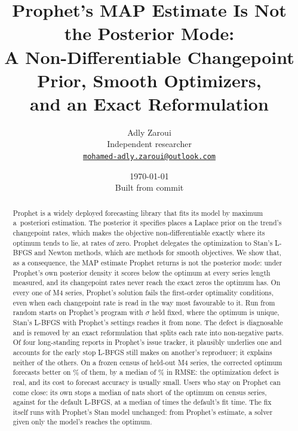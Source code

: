 \documentclass[11pt]{article}
\title{Prophet's MAP Estimate Is Not the Posterior Mode:\\
       A Non-Differentiable Changepoint Prior, Smooth Optimizers,\\
       and an Exact Reformulation}
\author{Adly Zaroui\\[2pt]
  {\small Independent researcher}\\[1pt]
  {\small\href{mailto:mohamed-adly.zaroui@outlook.com}%
                {\texttt{mohamed-adly.zaroui@outlook.com}}}}
\date{\today\\[2pt]{\small Built from commit \texttt{\BuildCommit}}}
\newcommand{\code}[1]{\path{#1}}
\theoremstyle{plain}
\theoremstyle{remark}
\begin{document}
\maketitle

\begin{abstract}
Prophet is a widely deployed forecasting library that fits its model by maximum
a~posteriori estimation. The posterior it specifies places a Laplace prior on
the trend's changepoint rates, which makes the objective non-differentiable
exactly where its optimum tends to lie, at rates of zero. Prophet delegates the
optimization to Stan's L-BFGS and Newton methods, which are methods for smooth
objectives. We show that, as a consequence, the MAP estimate Prophet returns is not
the posterior mode: under Prophet's own posterior density it scores below the
optimum at every series length measured, and its changepoint rates never reach the
exact zeros the optimum has. On every one of \KktSeries{} M4 series,
Prophet's solution fails the first-order optimality conditions, even when each
changepoint rate is read in the way most favourable to it.
Run from \MultiTotal{} random starts on Prophet's program with $\sigma$ held fixed,
where the optimum is unique, Stan's L-BFGS with Prophet's settings reaches it from
none. The defect is diagnosable and is removed by an exact reformulation that splits
each rate into non-negative parts. Of four long-standing reports in Prophet's issue
tracker, it plausibly underlies one and accounts for the early stop L-BFGS still makes
on another's reproducer; it explains neither of the others. On a frozen census of \CensusSeries{}
held-out M4 series, the corrected optimum forecasts better on \RmseWinRate\% of
them, by a median of \RmseAdvantage\% in RMSE: the optimization defect is real,
and its cost to forecast accuracy is usually small.
Users who stay on Prophet can come close: its own \code{algorithm="Newton"} stops a
median of \NewtonCensusNewtonMedian{} nats short of the optimum on
\NewtonCensusSeries{} census series, against \NewtonCensusLbfgsMedian{} for the default
L-BFGS, at a median of \NewtonCensusTimeRatio{} times the default's fit time. The fix
itself runs with Prophet's Stan model unchanged: from Prophet's estimate, a solver given
only the model's \code{log_prob} reaches the optimum.
\end{abstract}
















\appendix

\end{document}
